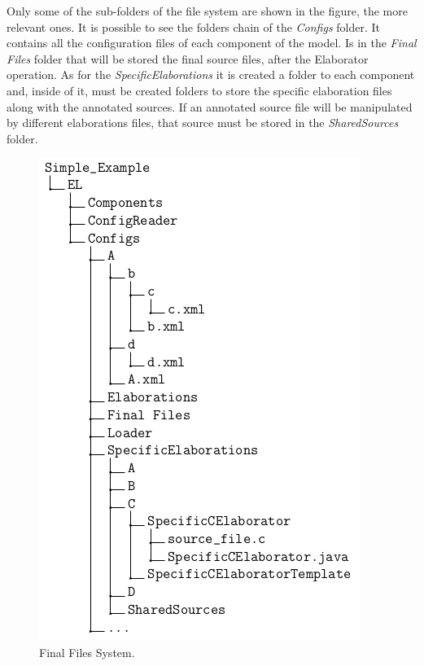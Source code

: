 Only some of the sub-folders of the file system are shown in the figure, the more relevant ones. It is possible to see the folders chain of the \textit{Configs} folder. It contains all the configuration files of each component of the model. Is in the \textit{Final Files} folder that will be stored the final source files, after the Elaborator operation. As for the \textit{SpecificElaborations} it is created a folder to each component and, inside of it, must be created folders to store the specific elaboration files along with the annotated sources. If an annotated source file will be manipulated by different elaborations files, that source must be stored in the \textit{SharedSources} folder.

\begin{figure}[H]
\centering
\includegraphics[scale=0.6]{images/files_system}
\caption{Final Files System.}
\label{fig:file_system} 
\end{figure}


